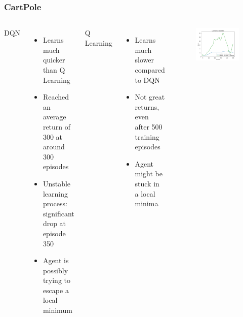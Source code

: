 \documentclass{beamer}
\begin{document}
\begin{frame}
    \frametitle{CartPole}
    \begin{columns}
        DQN\pause
        \begin{itemize}
            \item Learns much quicker than Q Learning \pause
            \item Reached an average return of 300 at around 300 episodes \pause
            \item Unstable learning process: significant drop at episode 350 \pause
            \item Agent is possibly trying to escape a local minimum \pause
        \end{itemize}
        Q Learning\pause
        \begin{itemize}
            \item Learns much slower compared to DQN \pause
            \item Not great returns, even after 500 training episodes \pause
            \item Agent might be stuck in a local minima
        \end{itemize}
        \begin{figure}[H]
            \centering
            \includegraphics[width=\textwidth]{../plots/cartpole}
        \end{figure}
    \end{columns}

\end{frame}
\end{document}

